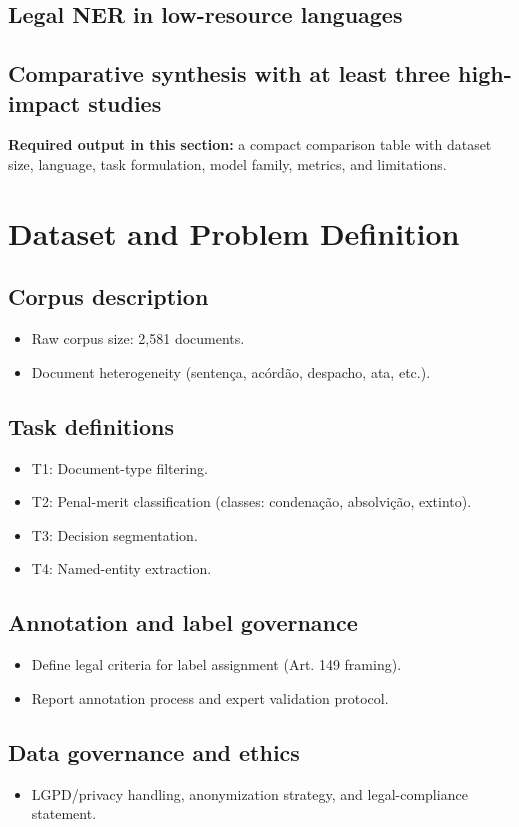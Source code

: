 \documentclass[a4paper,fleqn]{cas-sc}
\begin{document}
\subsection{Legal NER in low-resource languages}
\subsection{Comparative synthesis with at least three high-impact studies}
\textbf{Required output in this section:} a compact comparison table with dataset size, language, task formulation, model family, metrics, and limitations.

\section{Dataset and Problem Definition}
\label{sec:data}
\subsection{Corpus description}
\begin{itemize}
    \item Raw corpus size: 2,581 documents.
    \item Document heterogeneity (senten\c{c}a, ac\'ord\~ao, despacho, ata, etc.).
\end{itemize}
\subsection{Task definitions}
\begin{itemize}
    \item T1: Document-type filtering.
    \item T2: Penal-merit classification (classes: condena\c{c}\~ao, absolvi\c{c}\~ao, extinto).
    \item T3: Decision segmentation.
    \item T4: Named-entity extraction.
\end{itemize}
\subsection{Annotation and label governance}
\begin{itemize}
    \item Define legal criteria for label assignment (Art. 149 framing).
    \item Report annotation process and expert validation protocol.
\end{itemize}
\subsection{Data governance and ethics}
\begin{itemize}
    \item LGPD/privacy handling, anonymization strategy, and legal-compliance statement.
\end{itemize}
\end{document}
